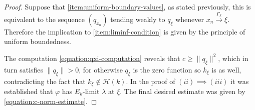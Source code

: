 \documentclass[10pt,a4paper]{amsart}
\newcommand{\Hilbert}{\mathcal{H}}
\newcommand{\xto}[1]{\stackrel{#1}{\to}}
\renewcommand{\phi}{\varphi}
\begin{document}
\begin{proof}
Suppose that \ref{item:uniform-boundary-values}, as stated previously,
this is equivalent to the sequence $(q_{x_n})$ tending weakly to $q_\xi$
whenever $x_n\xto{\Gamma_k}\xi$. Therefore the implication to \ref{item:liminf-condition}
is given by the principle of uniform boundedness.

The computation \eqref{equation:qxi-computation} reveals that $c\geq\|q_\xi\|^2$, which in
turn satisfies $\|q_\xi\|>0$, for otherwise $q_\xi$ is the zero function so $k_\xi$ is
as well, contradicting the fact that $k_\xi\notin\Hilbert(k)$.
In the proof of $(ii)\implies(iii)$ it was established that $\phi$ has $E_k$-limit
$\lambda$ at $\xi$.
The final desired estimate was given by \eqref{equation:c-norm-estimate}.
\end{proof}
\end{document}
